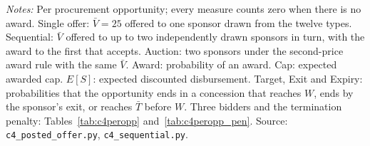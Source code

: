 \begin{table}[htbp]
\begin{tabular}{ccccccccc}
\bottomrule\end{tabular}
\par\smallskip\begin{minipage}{\textwidth}\footnotesize\textit{Notes:} Per procurement opportunity; every measure counts zero when there is no award. Single offer: $\bar V = 25$ offered to one sponsor drawn from the twelve types. Sequential: $\bar V$ offered to up to two independently drawn sponsors in turn, with the award to the first that accepts. Auction: two sponsors under the second-price award rule with the same $\bar V$. Award: probability of an award. Cap: expected awarded cap. $E[S]$: expected discounted disbursement. Target, Exit and Expiry: probabilities that the opportunity ends in a concession that reaches $W$, ends by the sponsor's exit, or reaches $\bar T$ before $W$. Three bidders and the termination penalty: Tables~\ref{tab:c4peropp} and~\ref{tab:c4peropp_pen}. Source: \texttt{c4\_posted\_offer.py}, \texttt{c4\_sequential.py}.\end{minipage}
\end{table}